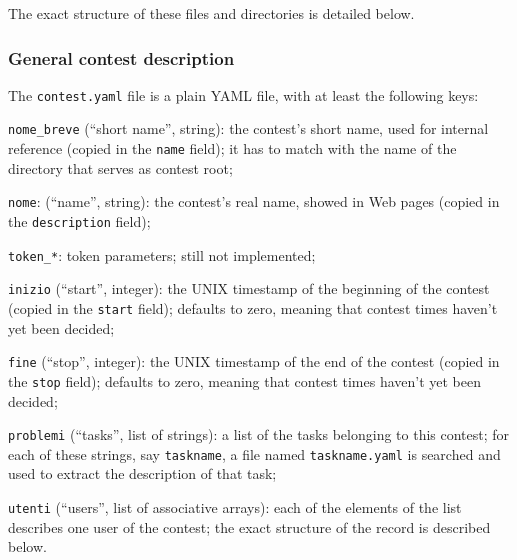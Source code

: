 \documentclass[a4paper,8pt]{amsart}
\newenvironment{squishlist}{%
  \begin{list}{\textbullet}%
    { \setlength{\itemsep}{0pt}%
      \setlength{\parsep}{3pt}%
      \setlength{\topsep}{3pt}%
      \setlength{\partopsep}{0pt}%
      \setlength{\leftmargin}{1.5em}%
      \setlength{\labelwidth}{1em}%
      \setlength{\labelsep}{0.5em} }%
}{\end{list}}
\newcommand{\id}[1]{\texttt{#1}}
\newcommand{\file}[1]{\texttt{#1}}
\begin{document}
\begin{multicols}{2}
\begin{squishlist}
  \end{squishlist}

  The exact structure of these files and directories is detailed
  below.

  \subsubsection{General contest description}

  The \file{contest.yaml} file is a plain YAML file, with at least the
  following keys:

  \begin{squishlist}

  \item \id{nome\_breve} (``short name'', string): the contest's short
    name, used for internal reference (copied in the \id{name} field);
    it has to match with the name of the directory that serves as
    contest root;

  \item \id{nome}: (``name'', string): the contest's real name, showed
    in Web pages (copied in the \id{description} field);

  \item \id{token\_*}: token parameters; still not implemented; %

  \item \id{inizio} (``start'', integer): the UNIX timestamp of the
    beginning of the contest (copied in the \id{start} field);
    defaults to zero, meaning that contest times haven't yet been
    decided;

  \item \id{fine} (``stop'', integer): the UNIX timestamp of the end
    of the contest (copied in the \id{stop} field); defaults to zero,
    meaning that contest times haven't yet been decided;

  \item \id{problemi} (``tasks'', list of strings): a list of the
    tasks belonging to this contest; for each of these strings, say
    \id{taskname}, a file named \file{taskname.yaml} is searched and
    used to extract the description of that task;

  \item \id{utenti} (``users'', list of associative arrays): each of
    the elements of the list describes one user of the contest; the
    exact structure of the record is described below.

  \end{squishlist}


\end{multicols}
\end{document}

